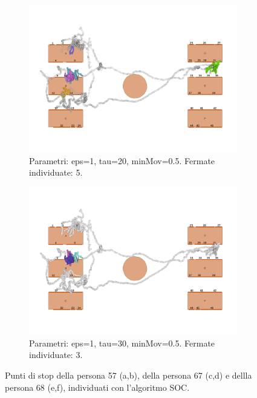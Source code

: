 \documentclass[12pt]{article}
\begin{document}
\begin{figure}[htb!]
\begin{subfigure}[b]{0.45\textwidth}
        \centering
        \includegraphics[width=\textwidth]{images/stop_points_p68_SOC_eps1_tau20_minMov05.png}
        \caption{Parametri: eps=1, tau=20, minMov=0.5. Fermate individuate: 5.}
        \label{stop_points_p68_SOC_eps1_tau20_minMov05}
    \end{subfigure}
    \hfill
    \begin{subfigure}[b]{0.45\textwidth}
        \centering
        \includegraphics[width=\textwidth]{images/stop_points_p68_SOC_eps1_tau30_minMov05.png}
        \caption{Parametri: eps=1, tau=30, minMov=0.5. Fermate individuate: 3.}
        \label{stop_points_p68_SOC_eps1_tau30_minMov05}
    \end{subfigure}
    \hfill
    \caption{Punti di stop della persona 57 (a,b), della persona 67 (c,d) e dellla persona 68 (e,f), individuati con l'algoritmo SOC.}
    \label{stop_points_SOC}
\end{figure}
\end{document}

